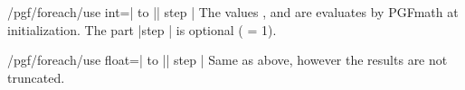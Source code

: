 \begin{key}{/pgf/foreach/use int=| to || step |}
The values ,  and  are evaluates by PGFmath at initialization.
The part |step | is optional ( = 1).
\end{key}

\begin{key}{/pgf/foreach/use float=| to || step |}
Same as above, however the results are not truncated.
\end{key}

\endinput